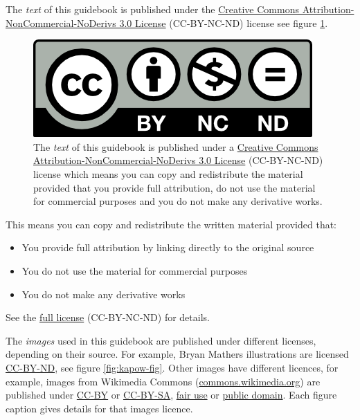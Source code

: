 \documentclass[
]{book}
\providecommand{\tightlist}{%
  \setlength{\itemsep}{0pt}\setlength{\parskip}{0pt}}
\begin{document}
The \emph{text} of this guidebook is published under the \href{https://creativecommons.org/licenses/by-nc-nd/3.0/}{Creative Commons Attribution-NonCommercial-NoDerivs 3.0 License} (CC-BY-NC-ND) license see figure \ref{fig:cc-by-nc-nd-fig}.

\begin{figure}

{\centering \includegraphics[width=1\linewidth]{images/by-nc-nd} 

}

\caption{The \emph{text} of this guidebook is published under a \href{https://creativecommons.org/licenses/by-nc-nd/3.0/}{Creative Commons Attribution-NonCommercial-NoDerivs 3.0 License} (CC-BY-NC-ND) license which means you can copy and redistribute the material provided that you provide full attribution, do not use the material for commercial purposes and you do not make any derivative works.}\label{fig:cc-by-nc-nd-fig}
\end{figure}



This means you can copy and redistribute the written material provided that:

\begin{itemize}
\tightlist
\item
  You provide full attribution by linking directly to the original source
\item
  You do not use the material for commercial purposes
\item
  You do not make any derivative works
\end{itemize}

See the \href{https://creativecommons.org/licenses/by-nc-nd/3.0/}{full license} (CC-BY-NC-ND) for details.

The \emph{images} used in this guidebook are published under different licenses, depending on their source. For example, Bryan Mathers illustrations are licensed \href{https://creativecommons.org/licenses/by-nd/4.0/}{CC-BY-ND}, see figure \ref{fig:kapow-fig}. Other images have different licences, for example, images from Wikimedia Commons (\href{https://commons.wikimedia.org/}{commons.wikimedia.org}) are published under \href{https://creativecommons.org/licenses/by/2.0/}{CC-BY} or \href{https://creativecommons.org/licenses/by-sa/2.0/}{CC-BY-SA}, \href{https://en.wikipedia.org/wiki/Fair_use}{fair use} or \href{https://en.wikipedia.org/wiki/Public_domain}{public domain}. Each figure caption gives details for that images licence.
\end{document}
